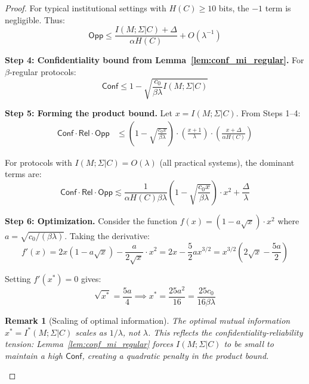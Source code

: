 \documentclass{ieeeaccess}
\newcommand{\Conf}{\mathsf{Conf}}
\newcommand{\Rel}{\mathsf{Rel}}
\newcommand{\Opp}{\mathsf{Opp}}
\newtheorem{remark}{Remark}[subsection]
\begin{document}
\begin{proof}
For typical institutional settings with $H(C) \geq 10$ bits, the $-1$ term is negligible. Thus:
\begin{equation}\label{eq:step3}
\Opp \leq \frac{I(M;\Sigma|C) + \Delta}{\alpha H(C)} + O(\lambda^{-1})
\end{equation}

\textbf{Step 4: Confidentiality bound from Lemma~\ref{lem:conf_mi_regular}.}
For $\beta$-regular protocols:
\begin{equation}\label{eq:step4}
\Conf \leq 1 - \sqrt{\frac{c_0}{\beta\lambda} I(M;\Sigma|C)}
\end{equation}

\textbf{Step 5: Forming the product bound.} 
Let $x = I(M;\Sigma|C)$. From Steps 1--4:
\begin{align}
\Conf \cdot \Rel \cdot \Opp 
    &\leq \left(1 - \sqrt{\frac{c_0 x}{\beta\lambda}}\right) \cdot \left(\frac{x+1}{\lambda}\right) \cdot \left(\frac{x + \Delta}{\alpha H(C)}\right)
\end{align}

For protocols with $I(M;\Sigma|C) = O(\lambda)$ (all practical systems), the dominant terms are:
\begin{equation}
\Conf \cdot \Rel \cdot \Opp \lesssim \frac{1}{\alpha H(C) \beta \lambda} \left(1 - \sqrt{\frac{c_0 x}{\beta\lambda}}\right) \cdot x^2 + \frac{\Delta}{\lambda}
\end{equation}

\textbf{Step 6: Optimization.} 
Consider the function $f(x) = (1 - a\sqrt{x}) \cdot x^2$ where $a = \sqrt{c_0/(\beta\lambda)}$. Taking the derivative:
\begin{equation}
f'(x) = 2x(1 - a\sqrt{x}) - \frac{a}{2\sqrt{x}} \cdot x^2 = 2x - \frac{5}{2}ax^{3/2} = x^{3/2}\left(2\sqrt{x} - \frac{5a}{2}\right)
\end{equation}

Setting $f'(x^*) = 0$ gives:
\begin{equation}
\sqrt{x^*} = \frac{5a}{4} \implies x^* = \frac{25a^2}{16} = \frac{25c_0}{16\beta\lambda}
\end{equation}

\begin{remark}[Scaling of optimal information]
The optimal mutual information $x^* = I^*(M;\Sigma|C)$ scales as $1/\lambda$, not $\lambda$. This reflects the confidentiality-reliability tension: Lemma~\ref{lem:conf_mi_regular} forces $I(M;\Sigma|C)$ to be small to maintain a high $\Conf$, creating a quadratic penalty in the product bound.
\end{remark}


\end{proof}
\end{document}

